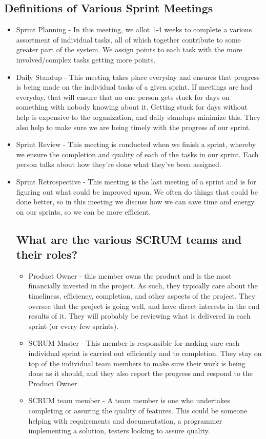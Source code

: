 \documentclass{article}
\begin{document}
\subsection{Definitions of Various Sprint Meetings}
\begin{itemize}
    \item Sprint Planning - In this meeting, we allot 1-4 weeks to complete a various assortment of individual tasks, all of which together contribute to some greater part of the system.  We assign points to each task with the more involved/complex tasks getting more points.
    \item Daily Standup - This meeting takes place everyday and ensures that progress is being made on the individual tasks of a given sprint.  If meetings are had everyday, that will ensure that no one person gets stuck for days on something with nobody knowing about it.  Getting stuck for days without help is expensive to the organization, and daily standups minimize this.  They also help to make sure we are being timely with the progress of our sprint.
    \item Sprint Review - This meeting is conducted when we finish a sprint, whereby we ensure the completion and quality of each of the tasks in our sprint.  Each person talks about how they're done what they've been assigned.  
    \item Sprint Retrospective - This meeting is the last meeting of a sprint and is for figuring out what could be improved upon.  We often do things that could be done better, so in this meeting we discuss how we can save time and energy on our sprints, so we can be more efficient.
    
    \subsection{What are the various SCRUM teams and their roles?}
    \begin{itemize}
        \item Product Owner - this member owns the product and is the most financially invested in the project.  As such, they typically care about the timeliness, efficiency, completion, and other aspects of the project.  They oversee that the project is going well, and have direct interests in the end results of it.  They will probably be reviewing what is delivered in each sprint (or every few sprints).  
        \item SCRUM Master - This member is responsible for making sure each individual sprint is carried out efficiently and to completion.  They stay on top of the individual team members to make sure their work is being done as it should, and they also report the progress and respond to the Product Owner
        \item SCRUM team member - A team member is one who undertakes completing or assuring the quality of features.  This could be someone helping with requirements and documentation, a programmer implementing a solution, testers looking to assure quality. 
    \end{itemize}
\end{itemize}
\end{document}
